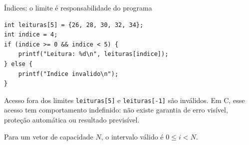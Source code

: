 \begin{frame}[fragile]{Índices: o limite é responsabilidade do programa}
\begin{lstlisting}
int leituras[5] = {26, 28, 30, 32, 34};
int indice = 4;
if (indice >= 0 && indice < 5) {
    printf("Leitura: %d\n", leituras[indice]);
} else {
    printf("Indice invalido\n");
}
\end{lstlisting}
\begin{alertblock}{Acesso fora dos limites}
\texttt{leituras[5]} e \texttt{leituras[-1]} são inválidos. Em C, esse acesso tem comportamento indefinido: não existe garantia de erro visível, proteção automática ou resultado previsível.
\end{alertblock}
Para um vetor de capacidade $N$, o intervalo válido é $0 \leq i < N$.
\end{frame}
